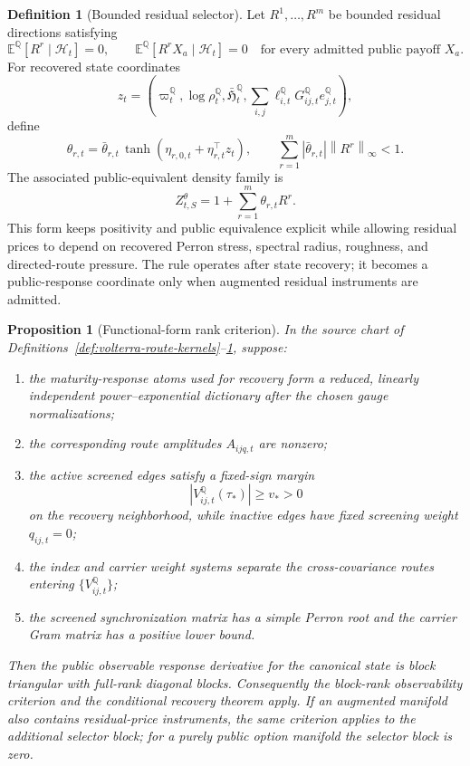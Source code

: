 \documentclass[11pt,a4paper]{amsart}
\theoremstyle{plain}
\newtheorem{proposition}[theorem]{Proposition}
\theoremstyle{definition}
\newtheorem{definition}[theorem]{Definition}
\theoremstyle{remark}
\newcommand{\QQ}{\mathbb{Q}}
\newcommand{\EE}{\mathbb{E}}
\newcommand{\cH}{\mathcal{H}}
\newcommand{\norm}[1]{\left\lVert #1\right\rVert}
\begin{document}
\begin{definition}[Bounded residual selector]\label{def:functional-residual-selector}
Let \(R^1,\dots,R^m\) be bounded residual directions satisfying
\[
        \EE^\QQ[R^r\mid\cH_t]=0,
        \qquad
        \EE^\QQ[R^r X_a\mid\cH_t]=0
        \quad\text{for every admitted public payoff }X_a .
\]
For recovered state coordinates
\[
        z_t
        =
        \left(
        \varpi_t^\QQ,\log\rho_t^\QQ,\bar{\mathfrak{H}}_t^\QQ,
        \sum_{i,j}\ell_{i,t}^\QQ G_{ij,t}^\QQ e_{j,t}^\QQ
        \right),
\]
define
\[
        \theta_{r,t}
        =
        \bar\theta_{r,t}\,
        \tanh\!\left(\eta_{r,0,t}+\eta_{r,t}^{\top}z_t\right),
        \qquad
        \sum_{r=1}^m |\bar\theta_{r,t}|\norm{R^r}_\infty<1.
\]
The associated public-equivalent density family is
\[
        Z_{t,S}^{\theta}
        =
        1+\sum_{r=1}^m \theta_{r,t}R^r .
\]
This form keeps positivity and public equivalence explicit while allowing residual prices to
depend on recovered Perron stress, spectral radius, roughness, and directed-route pressure.  The rule
operates after state recovery; it becomes a public-response coordinate only when augmented residual
instruments are admitted.
\end{definition}

\begin{proposition}[Functional-form rank criterion]\label{prop:functional-rank}
In the source chart of Definitions~\ref{def:volterra-route-kernels}--\ref{def:functional-residual-selector},
suppose:
\begin{enumerate}[leftmargin=2em]
\item the maturity-response atoms used for recovery form a reduced, linearly independent
power--exponential dictionary after the chosen gauge normalizations;
\item the corresponding route amplitudes \(A_{ijq,t}\) are nonzero;
\item the active screened edges satisfy a fixed-sign margin
\[
        |V_{ij,t}^\QQ(\tau_*)|\ge v_*>0
\]
on the recovery neighborhood, while inactive edges have fixed screening weight \(q_{ij,t}=0\);
\item the index and carrier weight systems separate the cross-covariance routes entering
\(\{V_{ij,t}^\QQ\}\);
\item the screened synchronization matrix has a simple Perron root and the carrier Gram matrix
has a positive lower bound.
\end{enumerate}
Then the public observable response derivative for the canonical state is block triangular with
full-rank diagonal blocks.
Consequently the block-rank observability criterion and the conditional recovery theorem apply.
If an augmented manifold also contains residual-price instruments, the same criterion applies to
the additional selector block; for a purely public option manifold the selector block is zero.
\end{proposition}
\end{document}
